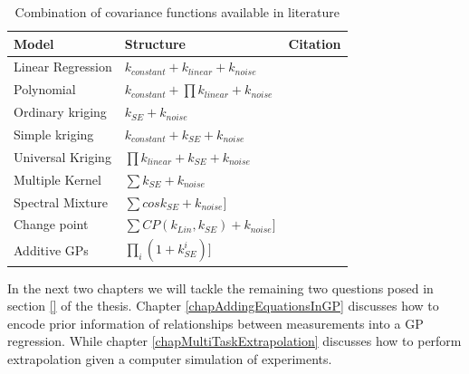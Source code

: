 \begin{table}[!h]
    \centering
\begin{tabularx}{\textwidth}{|l|l|c|}
  \hline
Model  & Structure & Citation \\
  \hline 
  \hline
Linear Regression & \small $k_{constant}+k_{linear}+k_{noise}$ &  \normalsize\\
Polynomial & \small $k_{constant}+\prod k_{linear}+k_{noise}$ &  \normalsize\\
Ordinary kriging & \small $k_{SE} + k_{noise}$ \normalsize &  \cite{krige1951statistical} \\
Simple kriging & \small $k_{constant}+k_{SE} + k_{noise}$ &  \normalsize\\
Universal Kriging & \small $\prod k_{linear}+k_{SE} + k_{noise}$ \normalsize & \cite{matheron1963principles} \\ Multiple Kernel & \small $\sum k_{SE} + k_{noise}$ \normalsize  &  \\
Spectral Mixture & \small  $\sum cos k_{SE} + k_{noise} ]$ \normalsize & \cite{wilson2013gaussian} \\
Change point & \small  $\sum CP(k_{Lin}, k_{SE}) + k_{noise} ]$ \normalsize & \cite{osborne2010bayesian} \\
Additive GPs & \small  $\prod_{i}(1+k^{i}_{SE}) ]$ \normalsize& \cite{duvenaud2011additive} \normalsize\\
   \hline
\end{tabularx}
  \label{tabListOfCovarianceFUnctions}
  \caption{Combination of covariance functions available in literature}
  \end{table}
 
In the next two chapters we will tackle the remaining two questions posed in section \ref{} of the thesis. Chapter \ref{chapAddingEquationsInGP} discusses how to encode prior information of relationships between measurements into a GP regression. While chapter \ref{chapMultiTaskExtrapolation} discusses how to perform extrapolation given a computer simulation of experiments. 
